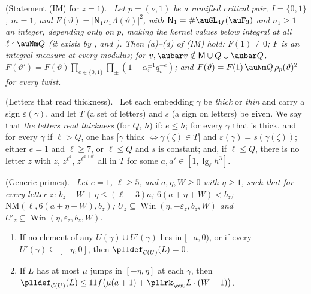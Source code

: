 \documentclass[10pt]{amsart}
\theoremstyle{definition}
\theoremstyle{remark}
\providecommand{\pkiC}{\mathcal C}
\providecommand{\pkiWin}{\operatorname{Win}}
\providecommand{\pkilog}{\operatorname{lg}}
\newenvironment{quotedthm}[2]{\par\medskip\noindent\begingroup
  \textbf{#1}#2.\ \itshape\ignorespaces}{\endgroup\par\medskip}
\newenvironment{quoteddef}[2]{\par\medskip\noindent\begingroup
  \textbf{#1}#2.\ \ignorespaces}{\endgroup\par\medskip}
\begin{document}
\begin{quotedthm}{\cite[Proposition~3.12]{P54}}{ (Statement (IM) for $z=1$)}
Let $p=(\nu,1)$ be a ramified critical pair, $I=\{0,1\}$, $m=1$, and $F(\vartheta)=|\mathsf N_1n_1
\Lambda(\vartheta)|^2$, with $\mathsf N_1=\#\auGL_{4f}(\auF_3)$ and $n_1\ge1$ an integer, depending only on $p$, making the kernel values below integral at all
$\ell\nmid\auNm Q$ (it exists by {\cite[Proposition~5.30]{P49}}, {\cite[Corollary~7.16]{P49}} and {\cite[Lemma~3.6]{P54}}). Then {\rm(a)}--{\rm(d)}
of {\rm(IM)} hold: $F(1)\ne0$; $F$ is an integral measure at every modulus; for $v,\aubar v\notin\mathsf M
\cup Q\cup\aubar Q$, $F(\vartheta')=F(\vartheta)\prod_{e\in\{0,1\}}\prod_\pm(1-\alpha_v^{\pm1}q_v^{-e})$; and
$F(\vartheta)=F(1)\,\auNm Q\,\rho_p(\vartheta)^2$ for every twist.
\end{quotedthm}

\begin{quoteddef}{\cite[Definition~2.4]{P56}}{ (Letters that read thickness)}
Let each embedding $\gamma$ be \emph{thick} or \emph{thin} and carry a sign $\varepsilon(\gamma)$, and
let $T$ (a set of letters) and $s$ (a sign on letters) be given. We say that \emph{the letters read
thickness} (for $Q$, $h$) if: $e\le h$; for every $\gamma$ that is thick, and for every $\gamma$ if
$\ell>Q$, one has [$\gamma$ thick $\Leftrightarrow\gamma(\zeta)\in T$] and
$\varepsilon(\gamma)=s(\gamma(\zeta))$; either $e=1$ and $\ell\ge7$, or $\ell\le Q$ and $s$ is
constant; and, if $\ell\le Q$, there is no letter $z$ with $z$, $z^{\ell^{a}}$, $z^{\ell^{a+a'}}$ all
in $T$ for some $a,a'\in[1,\pkilog_\ell h^3]$.
\end{quoteddef}

\begin{quotedthm}{\cite[Proposition~2.5]{P56}}{ (Generic primes)}
Let $e=1$, $\ell\ge5$, and $a,\eta,W\ge0$ with $\eta\ge1$, such that for every letter $z$:
$b_z+W+\eta\le(\ell-3)a$; $6(a+\eta+W)<b_z$; $\mathrm{NM}(\ell,6(a+\eta+W),b_z)$; $U_z\subseteq
\pkiWin(\eta,-\varepsilon_z,b_z,W)$ and $U'_z\subseteq\pkiWin(\eta,\varepsilon_z,b_z,W)$.
\begin{enumerate}
\item[(i)] If no element of any $U(\gamma)\cup U'(\gamma)$ lies in $[-a,0)$, or if every
$U'(\gamma)\subseteq[-\eta,0]$, then $\plldef_{\pkiC(U)}(L)=0$.
\item[(ii)] If $L$ has at most $\mu$ jumps in $[-\eta,\eta]$ at each $\gamma$, then
$\plldef_{\pkiC(U)}(L)\le11f\bigl(\mu(a+1)+\pllrk_\auO L\cdot(W+1)\bigr)$.
\end{enumerate}
\end{quotedthm}
\end{document}
